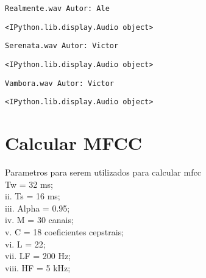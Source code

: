 \documentclass[11pt]{article}
\begin{document}
    
    \begin{Verbatim}[commandchars=\\\{\}]
Realmente.wav Autor: Ale

    \end{Verbatim}

    
    \begin{verbatim}
<IPython.lib.display.Audio object>
    \end{verbatim}

    
    \begin{Verbatim}[commandchars=\\\{\}]
Serenata.wav Autor: Victor

    \end{Verbatim}

    
    \begin{verbatim}
<IPython.lib.display.Audio object>
    \end{verbatim}

    
    \begin{Verbatim}[commandchars=\\\{\}]
Vambora.wav Autor: Victor

    \end{Verbatim}

    
    \begin{verbatim}
<IPython.lib.display.Audio object>
    \end{verbatim}

    
    \section{Calcular MFCC}\label{calcular-mfcc}

Parametros para serem utilizados para calcular mfcc\\
Tw = 32 ms;\\
ii. Ts = 16 ms;\\
iii. Alpha = 0.95;\\
iv. M = 30 canais;\\
v. C = 18 coeficientes cepstrais;\\
vi. L = 22;\\
vii. LF = 200 Hz;\\
viii. HF = 5 kHz;
\end{document}
